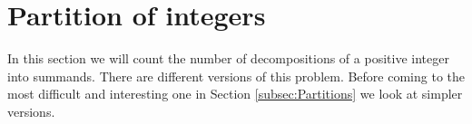 \section{Partition of integers}
In this section we will count the number of decompositions of a positive integer into summands.
There are different versions of this problem.
Before coming to the most difficult and interesting one in Section \ref{subsec:Partitions} we look at simpler versions.


